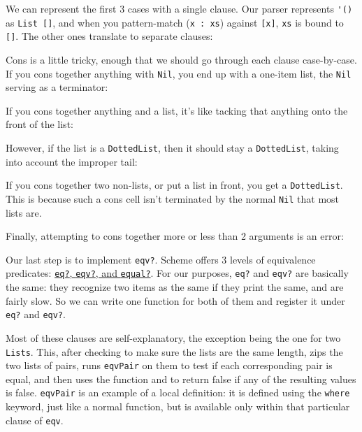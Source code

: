 We can represent the first 3 cases with a single clause. Our parser represents \lstinline|'()| as \verb|List []|, and when you pattern-match (\lstinline|x : xs|) against \verb|[x]|, \verb|xs| is bound to \lstinline|[]|. The other ones translate to separate clauses:
 
 
Cons is a little tricky, enough that we should go through each clause case-by-case. If you cons together anything with \verb|Nil|, you end up with a one-item list, the \verb|Nil| serving as a terminator:
 
 
If you cons together anything and a list, it's like tacking that anything onto the front of the list:
 
 
However, if the list is a \verb|DottedList|, then it should stay a \verb|DottedList|, taking into account the improper tail:
 
 
If you cons together two non-lists, or put a list in front, you get a \verb|DottedList|. This is because such a cons cell isn't terminated by the normal \verb|Nil| that most lists are.
 
 
Finally, attempting to cons together more or less than 2 arguments is an error:
 
 
Our last step is to implement \verb|eqv?|. Scheme offers 3 levels of equivalence predicates: \href{http://www.schemers.org/Documents/Standards/R5RS/HTML/r5rs-Z-H-9.html\#\%_sec_6.1}{\texttt{eq?}, \texttt{eqv?}, and \texttt{equal?}}. For our purposes, \verb|eq?| and \verb|eqv?| are basically the same: they recognize two items as the same if they print the same, and are fairly slow. So we can write one function for both of them and register it under \verb|eq?| and \verb|eqv?|.
 
 
Most of these clauses are self-explanatory, the exception being the one for two \verb|Lists|. This, after checking to make sure the lists are the same length, zips the two lists of pairs, runs \verb|eqvPair| on them to test if each corresponding pair is equal, and then uses the function and to return false if any of the resulting values is false. \verb|eqvPair| is an example of a local definition: it is defined using the \verb|where| keyword, just like a normal function, but is available only within that particular clause of \verb|eqv|.
 
